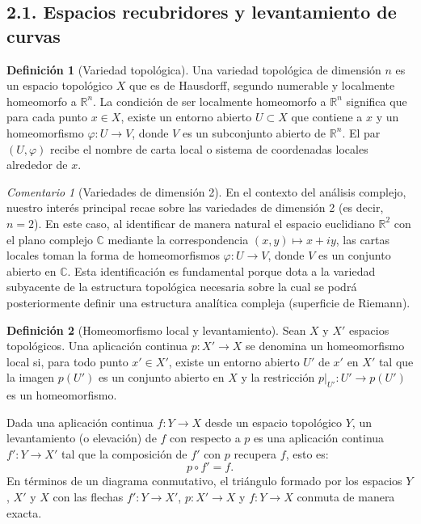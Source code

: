 \documentclass[11pt,a4paper]{article}
\theoremstyle{definition}
\newtheorem{definicion}{Definición}[section]
\theoremstyle{remark}
\newtheorem{observacion}{Comentario}[section]
\numberwithin{equation}{section}
\begin{document}
\newpage

\subsection{2.1. Espacios recubridores y levantamiento de curvas}

\begin{definicion}[Variedad topológica]
Una variedad topológica de dimensión $n$ es un espacio topológico $X$ que es de Hausdorff, segundo numerable y localmente homeomorfo a $\mathbb{R}^n$. La condición de ser localmente homeomorfo a $\mathbb{R}^n$ significa que para cada punto $x \in X$, existe un entorno abierto $U \subset X$ que contiene a $x$ y un homeomorfismo $\varphi: U \to V$, donde $V$ es un subconjunto abierto de $\mathbb{R}^n$. El par $(U, \varphi)$ recibe el nombre de carta local o sistema de coordenadas locales alrededor de $x$.
\end{definicion}

\begin{observacion}[Variedades de dimensión 2]
En el contexto del análisis complejo, nuestro interés principal recae sobre las variedades de dimensión 2 (es decir, $n=2$). En este caso, al identificar de manera natural el espacio euclidiano $\mathbb{R}^2$ con el plano complejo $\mathbb{C}$ mediante la correspondencia $(x,y) \mapsto x + iy$, las cartas locales toman la forma de homeomorfismos $\varphi: U \to V$, donde $V$ es un conjunto abierto en $\mathbb{C}$. Esta identificación es fundamental porque dota a la variedad subyacente de la estructura topológica necesaria sobre la cual se podrá posteriormente definir una estructura analítica compleja (superficie de Riemann).
\end{observacion}

\begin{definicion}[Homeomorfismo local y levantamiento]
Sean $X$ y $X'$ espacios topológicos. Una aplicación continua $p: X' \to X$ se denomina un homeomorfismo local si, para todo punto $x' \in X'$, existe un entorno abierto $U'$ de $x'$ en $X'$ tal que la imagen $p(U')$ es un conjunto abierto en $X$ y la restricción $p|_{U'}: U' \to p(U')$ es un homeomorfismo.

Dada una aplicación continua $f: Y \to X$ desde un espacio topológico $Y$, un levantamiento (o elevación) de $f$ con respecto a $p$ es una aplicación continua $f': Y \to X'$ tal que la composición de $f'$ con $p$ recupera $f$, esto es:
\begin{equation}
p \circ f' = f.
\end{equation}
En términos de un diagrama conmutativo, el triángulo formado por los espacios $Y$, $X'$ y $X$ con las flechas $f': Y \to X'$, $p: X' \to X$ y $f: Y \to X$ conmuta de manera exacta.
\end{definicion}
\end{document}
